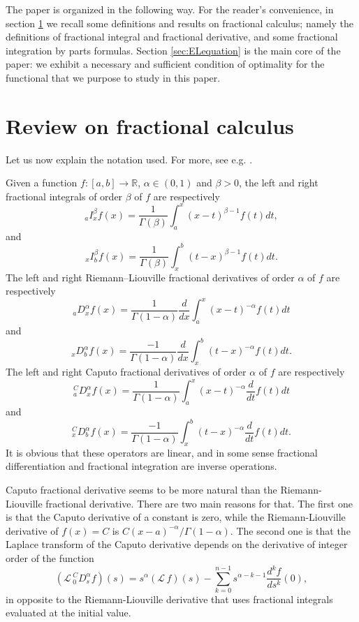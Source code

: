 \documentclass[10pt]{article}
\begin{document}
 The paper is organized in the following way. For the reader's convenience, in section \ref{sec:frac} we recall some definitions and results on
 fractional calculus; namely the definitions of fractional integral and fractional derivative, and some fractional integration by parts formulas.
 Section \ref{sec:ELequation} is the main core of the paper: we exhibit a necessary and sufficient condition of optimality for the functional that we purpose to study in  this paper.

\section{Review on fractional calculus}\label{sec:frac}

Let  us  now  explain  the  notation  used. For more, see e.g. \cite{Kilbas,Miller,samko}.

Given a function $f:[a,b]\to\mathbb{R}$, $\alpha\in(0,1)$ and $\beta>0$, the left and right fractional integrals of order $\beta$ of $f$ are respectively
$${_aI_x^\beta}f(x)=\frac{1}{\Gamma(\beta)}\int_a^x (x-t)^{\beta-1}f(t)dt,$$
and
$${_xI_b^\beta}f(x)=\frac{1}{\Gamma(\beta)}\int_x^b(t-x)^{\beta-1} f(t)dt.$$
The left and right Riemann--Liouville fractional derivatives of order $\alpha$ of $f$ are respectively
$${_aD_x^\alpha}f(x)=\frac{1}{\Gamma(1-\alpha)}\frac{d}{dx}\int_a^x(x-t)^{-\alpha}f(t)dt$$
and
$${_xD_b^\alpha}f(x)=\frac{-1}{\Gamma(1-\alpha)}\frac{d}{dx}\int_x^b (t-x)^{-\alpha} f(t)dt.$$
The left and right Caputo fractional derivatives of order $\alpha$ of $f$ are respectively
$${_a^CD_x^\alpha}f(x)=\frac{1}{\Gamma(1-\alpha)}\int_a^x (x-t)^{-\alpha}\frac{d}{dt}f(t)dt$$
and
$${_x^CD_b^\alpha}f(x)=\frac{-1}{\Gamma(1-\alpha)}\int_x^b(t-x)^{-\alpha}\frac{d}{dt} f(t)dt.$$
It is obvious that these operators are linear, and in some sense fractional differentiation and fractional integration are inverse operations.

Caputo fractional derivative seems to be more natural than the Riemann-Liouville fractional derivative. There are two main reasons for that.
The first one is that the Caputo derivative of a constant is zero, while the  Riemann-Liouville  derivative of $f(x)=C$ is $C(x-a)^{-\alpha}/\Gamma(1-\alpha)$. The second one is that the Laplace transform of the Caputo derivative depends on the derivative of integer order of the function
$$(\mathcal{L}\,{_0^CD^\alpha_s}f)(s)=s^\alpha (\mathcal{L}\,f)(s)-\sum_{k=0}^{n-1}s^{\alpha-k-1}\frac{d^kf}{ds^k}(0),$$
in opposite to the Riemann-Liouville  derivative  that uses fractional integrals evaluated at the initial value.
\end{document}

